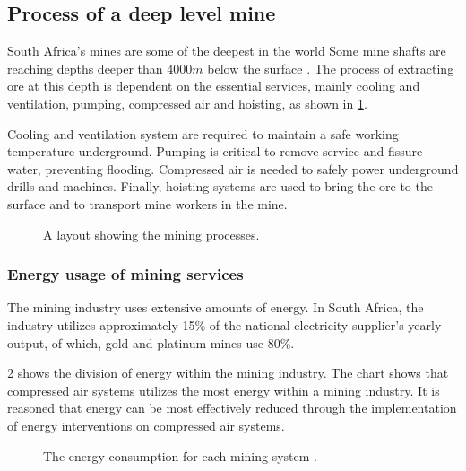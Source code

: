 	\subsection{Process of a deep level mine}
	South Africa's mines are some of the deepest in the world Some mine shafts are reaching depths deeper than $4000m$ below the surface \cite{vosloo2012case}. The process of extracting ore at this depth is dependent on the essential services, mainly cooling and ventilation, pumping, compressed air and hoisting, as shown in \cref{fig: Mining Layout}.
	\par 
	 Cooling and ventilation system are required to maintain a safe working temperature underground. Pumping is critical to remove service and fissure water, preventing flooding. Compressed air is needed to safely power underground drills and machines. Finally, hoisting systems are used to bring the ore to the surface and to transport mine workers in the mine. 
		\begin{figure}[h!]
			\centering
			\caption{A layout showing the mining processes.}
			\label{fig: Mining Layout}
		\end{figure}
		\subsubsection{Energy usage of mining services}
			The mining industry uses extensive amounts of energy. In South Africa, the industry utilizes approximately 15\% of the national electricity supplier's yearly output, of which, gold and platinum mines use 80\%.\cite{Eskom2010Energy}
			\par
			 \cref{fig: Energy Split} shows the division of energy within the mining industry. The chart shows that compressed air systems utilizes the most energy within a mining industry. It is reasoned that energy can be most effectively reduced through the implementation of energy interventions on compressed air systems.
			\begin{figure}[h]
				\centering
				\fbox{}
				\caption[The energy consumption for each mining system.]{The energy consumption for each mining system \cite{le2005energy}.}
				\label{fig: Energy Split}
			\end{figure}
\clearpage
